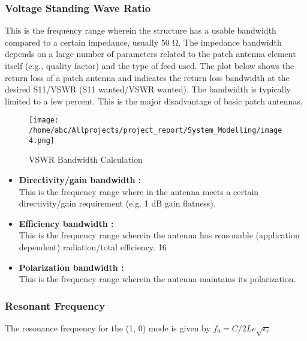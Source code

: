              \subsubsection{Voltage Standing Wave Ratio}
              \justify
                This is the frequency range wherein the structure has a usable bandwidth compared to a certain impedance, usually 50 Ω. The impedance bandwidth depends on a large number of parameters related to the patch antenna element itself (e.g., quality factor) and the type of feed used. The plot below shows the return loss of a patch antenna and indicates the return loss bandwidth at the desired S11/VSWR (S11 wanted/VSWR wanted). The bandwidth is typically  limited to a few percent. This is the major disadvantage of basic patch antennas.

              \begin{figure}[H]
              	\centering
              	\texttt{[image: /home/abc/Allprojects/project\_report/System\_Modelling/image4.png]}
              	\caption{VSWR Bandwidth Calculation}
              \end{figure}


              \begin{itemize}
					\item \textbf{Directivity/gain bandwidth : \\}
					This is the frequency range where in the antenna meets a certain directivity/gain
					requirement (e.g. 1 dB gain flatness).
					\item \textbf{Efficiency bandwidth : \\ }
					This is the frequency range wherein the antenna has reasonable (application dependent)
					radiation/total efficiency.
					16
					\item \textbf{Polarization bandwidth : \\}
					This is the frequency range wherein the antenna maintains its polarization.

              \end{itemize}
			\cleardoublepage
              \subsubsection{Resonant Frequency}\label{sub:Resonant Frequency}
               \justify
	              The resonance frequency for the (1, 0) mode is given by
			          \newline    \newline
			          \centering
			              $ f_0 = C/2Le\sqrt{\epsilon_r } $
				
